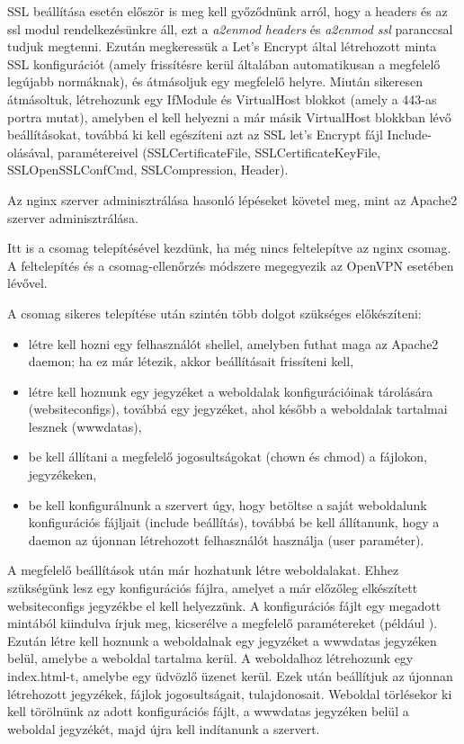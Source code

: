 SSL beállítása esetén először is meg kell győződnünk arról, hogy a headers és az ssl modul rendelkezésünkre áll, ezt a \textit{a2enmod headers} és \textit{a2enmod ssl} paranccsal tudjuk megtenni. Ezután megkeressük a Let's Encrypt által létrehozott minta SSL konfigurációt (amely frissítésre kerül általában automatikusan a megfelelő legújabb normáknak), és átmásoljuk egy megfelelő helyre. Miután sikeresen átmásoltuk, létrehozunk egy IfModule és VirtualHost blokkot (amely a 443-as portra mutat), amelyben el kell helyezni a már másik VirtualHost blokkban lévő beállításokat, továbbá ki kell egészíteni azt az SSL let's Encrypt fájl Include-olásával, paramétereivel (SSLCertificateFile, SSLCertificateKeyFile, SSLOpenSSLConfCmd, SSLCompression, Header).

\pagebreak


Az nginx szerver adminisztrálása hasonló lépéseket követel meg, mint az Apache2 szerver adminisztrálása.

Itt is a csomag telepítésével kezdünk, ha még nincs feltelepítve az nginx csomag. A feltelepítés és a csomag-ellenőrzés módszere megegyezik az OpenVPN esetében lévővel.

A csomag sikeres telepítése után szintén több dolgot szükséges előkészíteni:
\begin{itemize}
	\item létre kell hozni egy felhasználót \textit{} shellel, amelyben futhat maga az Apache2 daemon; ha ez már létezik, akkor beállításait frissíteni kell,
	\item létre kell hoznunk egy jegyzéket a weboldalak konfigurációinak tárolására (websiteconfigs), továbbá egy jegyzéket, ahol később a weboldalak tartalmai lesznek (wwwdatas),
	\item be kell állítani a megfelelő jogosultságokat (chown és chmod) a fájlokon, jegyzékeken,
	\item be kell konfigurálnunk a szervert úgy, hogy betöltse a saját weboldalunk konfigurációs fájljait (include beállítás), továbbá be kell állítanunk, hogy a daemon az újonnan létrehozott felhasználót használja (user paraméter).
\end{itemize}

A megfelelő beállítások után már hozhatunk létre weboldalakat. Ehhez szükségünk lesz egy konfigurációs fájlra, amelyet a már előzőleg elkészített websiteconfigs jegyzékbe el kell helyezzünk. A konfigurációs fájlt egy megadott mintából kiindulva írjuk meg, kicserélve a megfelelő paramétereket (például ). Ezután létre kell hoznunk a weboldalnak egy jegyzéket a wwwdatas jegyzéken belül, amelybe a weboldal tartalma kerül. A weboldalhoz létrehozunk egy index.html-t, amelybe egy üdvözlő üzenet kerül. Ezek után beállítjuk az újonnan létrehozott jegyzékek, fájlok jogosultságait, tulajdonosait. Weboldal törlésekor ki kell törölnünk az adott konfigurációs fájlt, a wwwdatas jegyzéken belül a weboldal jegyzékét, majd újra kell indítanunk a szervert.

